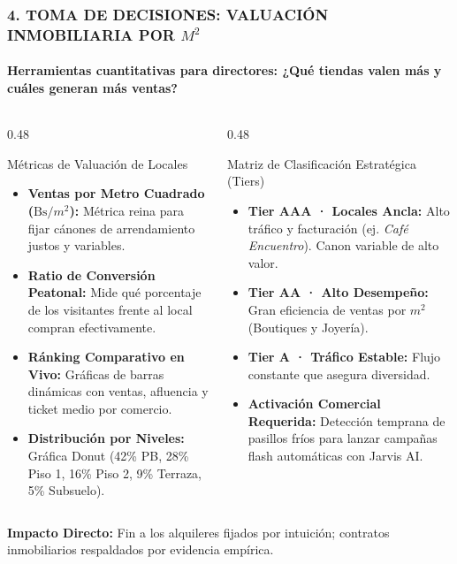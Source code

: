\documentclass[aspectratio=169, 10pt]{beamer}
\begin{document}
\begin{frame}
  \frametitle{4. TOMA DE DECISIONES: VALUACIÓN INMOBILIARIA POR $M^2$}
  \framesubtitle{Herramientas cuantitativas para directores: ¿Qué tiendas valen más y cuáles generan más ventas?}

  \begin{columns}[T]
    \begin{column}{0.48\textwidth}
      \begin{block}{Métricas de Valuación de Locales}
        \scriptsize
        \begin{itemize}\setlength\itemsep{0.25em}
          \item \textbf{Ventas por Metro Cuadrado ($\text{Bs}/m^2$):} Métrica reina para fijar cánones de arrendamiento justos y variables.
          \item \textbf{Ratio de Conversión Peatonal:} Mide qué porcentaje de los visitantes frente al local compran efectivamente.
          \item \textbf{Ránking Comparativo en Vivo:} Gráficas de barras dinámicas con ventas, afluencia y ticket medio por comercio.
          \item \textbf{Distribución por Niveles:} Gráfica Donut (42\% PB, 28\% Piso 1, 16\% Piso 2, 9\% Terraza, 5\% Subsuelo).
        \end{itemize}
      \end{block}
    \end{column}

    \begin{column}{0.48\textwidth}
      \begin{exampleblock}{Matriz de Clasificación Estratégica (Tiers)}
        \scriptsize
        \begin{itemize}\setlength\itemsep{0.25em}
          \item \textbf{Tier AAA · Locales Ancla:} Alto tráfico y facturación (ej. \textit{Café Encuentro}). Canon variable de alto valor.
          \item \textbf{Tier AA · Alto Desempeño:} Gran eficiencia de ventas por $m^2$ (Boutiques y Joyería).
          \item \textbf{Tier A · Tráfico Estable:} Flujo constante que asegura diversidad.
          \item \textbf{Activación Comercial Requerida:} Detección temprana de pasillos fríos para lanzar campañas flash automáticas con Jarvis AI.
        \end{itemize}
      \end{exampleblock}
    \end{column}
  \end{columns}

  \vskip 0.15cm
  \centering
  \color{AranjuezGold}\scriptsize \textbf{Impacto Directo:} Fin a los alquileres fijados por intuición; contratos inmobiliarios respaldados por evidencia empírica.
\end{frame}
\end{document}
